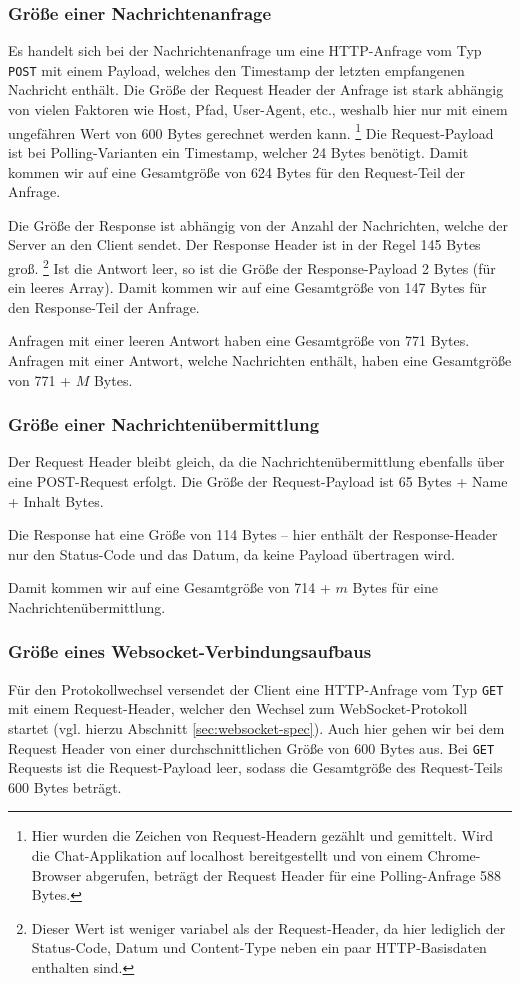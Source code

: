 \documentclass[sigplan, screen]{acmart}
\begin{document}
\subsubsection{Größe einer Nachrichtenanfrage}
Es handelt sich bei der Nachrichtenanfrage um eine HTTP-Anfrage vom Typ \texttt{POST} mit einem Payload, welches den Timestamp der letzten empfangenen Nachricht enthält.
Die Größe der Request Header der Anfrage ist stark abhängig von vielen Faktoren wie Host, Pfad, User-Agent, etc., weshalb hier nur mit einem ungefähren Wert von 600 Bytes gerechnet werden kann.
\footnote{Hier wurden die Zeichen von Request-Headern gezählt und gemittelt. Wird die Chat-Applikation auf localhost bereitgestellt und von einem Chrome-Browser abgerufen, beträgt der Request Header für eine Polling-Anfrage 588 Bytes.}
Die Request-Payload ist bei Polling-Varianten ein Timestamp, welcher 24 Bytes benötigt.
Damit kommen wir auf eine Gesamtgröße von 624 Bytes für den Request-Teil der Anfrage.

Die Größe der Response ist abhängig von der Anzahl der Nachrichten, welche der Server an den Client sendet.
Der Response Header ist in der Regel 145 Bytes groß.
\footnote{Dieser Wert ist weniger variabel als der Request-Header, da hier lediglich der Status-Code, Datum und Content-Type neben ein paar HTTP-Basisdaten enthalten sind.}
Ist die Antwort leer, so ist die Größe der Response-Payload 2 Bytes (für ein leeres Array).
Damit kommen wir auf eine Gesamtgröße von 147 Bytes für den Response-Teil der Anfrage.

Anfragen mit einer leeren Antwort haben eine Gesamtgröße von 771 Bytes.
Anfragen mit einer Antwort, welche Nachrichten enthält, haben eine Gesamtgröße von 771 + $M$ Bytes.

\subsubsection{Größe einer Nachrichtenübermittlung}
Der Request Header bleibt gleich, da die Nachrichtenübermittlung ebenfalls über eine POST-Request erfolgt.
Die Größe der Request-Payload ist 65 Bytes + Name + Inhalt Bytes.

Die Response hat eine Größe von 114 Bytes – hier enthält der Response-Header nur den Status-Code und das Datum, da keine Payload übertragen wird.

Damit kommen wir auf eine Gesamtgröße von 714 + $m$ Bytes für eine Nachrichtenübermittlung.


\subsubsection{Größe eines Websocket-Verbindungsaufbaus}
Für den Protokollwechsel versendet der Client eine HTTP-Anfrage vom Typ \texttt{GET} mit einem Request-Header, welcher den Wechsel zum WebSocket-Protokoll startet (vgl. hierzu Abschnitt \ref{sec:websocket-spec}).
Auch hier gehen wir bei dem Request Header von einer durchschnittlichen Größe von 600 Bytes aus.
Bei \texttt{GET} Requests ist die Request-Payload leer, sodass die Gesamtgröße des Request-Teils 600 Bytes beträgt.
\end{document}

